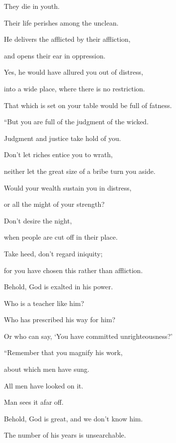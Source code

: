 {\par }{\Q {}They die in youth.
\par }{\QB Their life perishes among the unclean.
\par }{\Q {}He delivers the afflicted by their affliction,
\par }{\QB and opens their ear in oppression.
\par }{\Q {}Yes, he would have allured you out of distress,
\par }{\QB into a wide place, where there is no restriction.
\par }{\QB That which is set on your table would be full of fatness.
\par }{\BB \par }{\Q {}“But you are full of the judgment of the wicked.
\par }{\QB Judgment and justice take hold of you.
\par }{\Q {}Don’t let riches entice you to wrath,
\par }{\QB neither let the great size of a bribe turn you aside.
\par }{\Q {}Would your wealth sustain you in distress,
\par }{\QB or all the might of your strength?
\par }{\Q {}Don’t desire the night,
\par }{\QB when people are cut off in their place.
\par }{\Q {}Take heed, don’t regard iniquity;
\par }{\QB for you have chosen this rather than affliction.
\par }{\Q {}Behold, God is exalted in his power.
\par }{\QB Who is a teacher like him?
\par }{\Q {}Who has prescribed his way for him?
\par }{\QB Or who can say, ‘You have committed unrighteousness?’
\par }{\BB \par }{\Q {}“Remember that you magnify his work,
\par }{\QB about which men have sung.
\par }{\Q {}All men have looked on it.
\par }{\QB Man sees it afar off.
\par }{\Q {}Behold, God is great, and we don’t know him.
\par }{\QB The number of his years is unsearchable.
}
